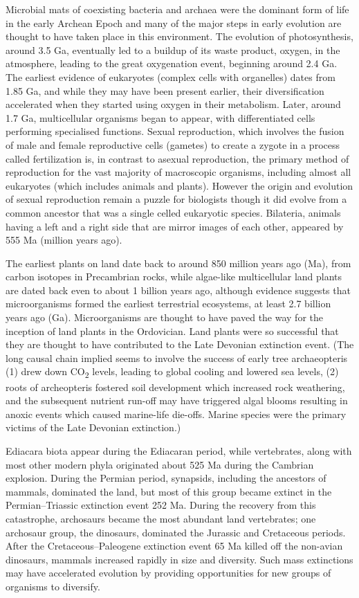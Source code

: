 Microbial mats of coexisting bacteria and archaea were the dominant form of life in the early Archean Epoch and many of the major steps in early evolution are thought to have taken place in this environment. The evolution of photosynthesis, around 3.5 Ga, eventually led to a buildup of its waste product, oxygen, in the atmosphere, leading to the great oxygenation event, beginning around 2.4 Ga. The earliest evidence of eukaryotes (complex cells with organelles) dates from 1.85 Ga, and while they may have been present earlier, their diversification accelerated when they started using oxygen in their metabolism. Later, around 1.7 Ga, multicellular organisms began to appear, with differentiated cells performing specialised functions. Sexual reproduction, which involves the fusion of male and female reproductive cells (gametes) to create a zygote in a process called fertilization is, in contrast to asexual reproduction, the primary method of reproduction for the vast majority of macroscopic organisms, including almost all eukaryotes (which includes animals and plants). However the origin and evolution of sexual reproduction remain a puzzle for biologists though it did evolve from a common ancestor that was a single celled eukaryotic species. Bilateria, animals having a left and a right side that are mirror images of each other, appeared by 555 Ma (million years ago).

The earliest plants on land date back to around 850 million years ago (Ma), from carbon isotopes in Precambrian rocks, while algae-like multicellular land plants are dated back even to about 1 billion years ago, although evidence suggests that microorganisms formed the earliest terrestrial ecosystems, at least 2.7 billion years ago (Ga). Microorganisms are thought to have paved the way for the inception of land plants in the Ordovician. Land plants were so successful that they are thought to have contributed to the Late Devonian extinction event. (The long causal chain implied seems to involve the success of early tree archaeopteris (1) drew down CO\textsubscript{2} levels, leading to global cooling and lowered sea levels, (2) roots of archeopteris fostered soil development which increased rock weathering, and the subsequent nutrient run-off may have triggered algal blooms resulting in anoxic events which caused marine-life die-offs. Marine species were the primary victims of the Late Devonian extinction.)

Ediacara biota appear during the Ediacaran period, while vertebrates, along with most other modern phyla originated about 525 Ma during the Cambrian explosion. During the Permian period, synapsids, including the ancestors of mammals, dominated the land, but most of this group became extinct in the Permian--Triassic extinction event 252 Ma. During the recovery from this catastrophe, archosaurs became the most abundant land vertebrates; one archosaur group, the dinosaurs, dominated the Jurassic and Cretaceous periods. After the Cretaceous--Paleogene extinction event 65 Ma killed off the non-avian dinosaurs, mammals increased rapidly in size and diversity. Such mass extinctions may have accelerated evolution by providing opportunities for new groups of organisms to diversify.

